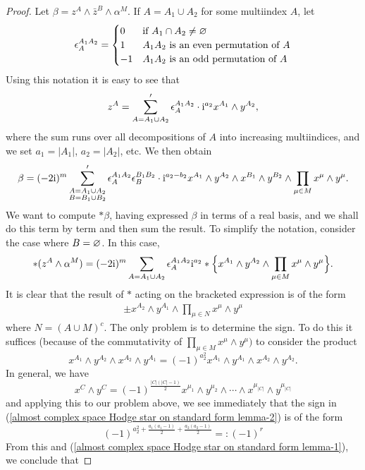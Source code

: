 \documentclass[11pt]{book}
\theoremstyle{definition}
\begin{document}
\begin{proof}
Let $\beta=z^A\wedge\bar{z}^B\wedge\alpha^M$. If $A=A_1\cup A_2$ for some multiindex $A$, let
\[\epsilon_A^{A_1A_2}=\begin{cases}
0&\text{if $A_1\cap A_2\neq\varnothing$}\\
1&\text{$A_1A_2$ is an even permutation of $A$}\\
-1&\text{$A_1A_2$ is an odd permutation of $A$}
\end{cases}\]
Using this notation it is easy to see that
\[z^A=\sum_{A=A_1\cup A_2}'\epsilon_A^{A_1A_2}\cdot\mathrm{i}^{a_2}x^{A_1}\wedge y^{A_2},\]
where the sum runs over all decompositions of $A$ into increasing multiindices, and we set $a_1=|A_1|$, $a_2=|A_2|$, etc. We then obtain 
\[\beta=(-2\mathrm{i})^m\sum'_{\substack{A=A_1\cup A_2\\B=B_1\cup B_2}}\epsilon_A^{A_1A_2}\epsilon_B^{B_1B_2}\cdot\mathrm{i}^{a_2-b_2}x^{A_1}\wedge y^{A_2}\wedge x^{B_1}\wedge y^{B_2}\wedge\prod_{\mu\in M}x^\mu\wedge y^\mu.\]
We want to compute $\ast\beta$, having expressed $\beta$ in terms of a real basis, and we shall do this term by term and then sum the result. To simplify the notation, consider the case where $B=\varnothing$. In this case,
\begin{align}\label{almost complex space Hodge star on standard form lemma-1}
\ast(z^A\wedge\alpha^M)=(-2\mathrm{i})^m\sum_{A=A_1\cup A_2}\epsilon_A^{A_1A_2}\mathrm{i}^{a_2}\ast\Big\{x^{A_1}\wedge y^{A_2}\wedge\prod_{\mu\in M}x^\mu\wedge y^\mu\Big\}.
\end{align}
It is clear that the result of $\ast$ acting on the bracketed expression is of the form
\begin{align}\label{almost complex space Hodge star on standard form lemma-2}
\pm x^{A_2}\wedge y^{A_1}\wedge\prod_{\mu\in N}x^\mu\wedge y^\mu
\end{align}
where $N=(A\cup M)^c$. The only problem is to determine the sign. To do this it suffices (because of the commutativity of $\prod_{\mu\in M}x^\mu\wedge y^\mu)$ to consider the product
\[x^{A_1}\wedge y^{A_2}\wedge x^{A_2}\wedge y^{A_1}=(-1)^{a_2^2}x^{A_1}\wedge y^{A_1}\wedge x^{A_2}\wedge y^{A_2}.\]
In general, we have
\[x^C\wedge y^C=(-1)^{\frac{|C|(|C|-1)}{2}}x^{\mu_1}\wedge y^{\mu_2}\wedge\cdots\wedge x^{\mu_{|C|}}\wedge y^{\mu_{|C|}}\]
and applying this to our problem above, we see immediately that the sign in (\ref{almost complex space Hodge star on standard form lemma-2}) is of the form
\[(-1)^{a_2^2+\frac{a_1(a_1-1)}{2}+\frac{a_2(a_2-1)}{2}}=:(-1)^r\]
From this and (\ref{almost complex space Hodge star on standard form lemma-1}), we conclude that

\end{proof}
\end{document}
